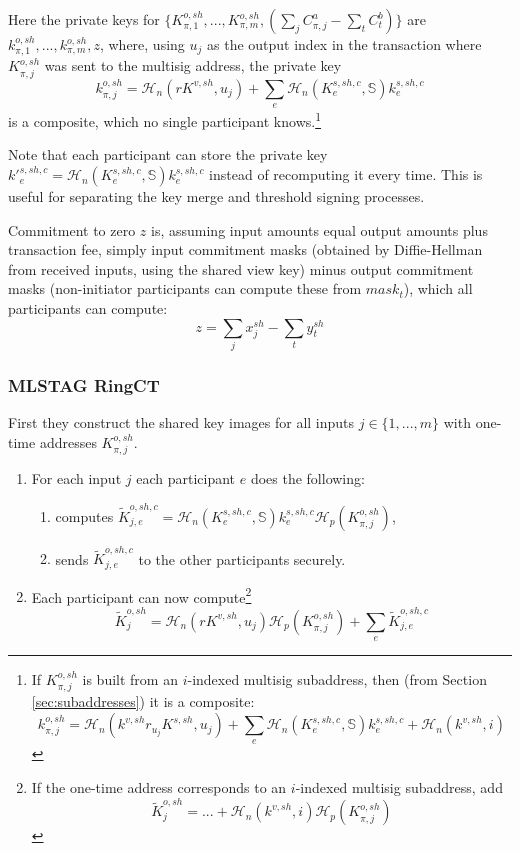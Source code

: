 Here the private keys for 
\(\{K^{o,sh}_{\pi,1},...,K^{o,sh}_{\pi,m}, (\sum\limits_j C_{\pi, j}^a - \sum\limits_t C^b_{t})\}\)
are \(k^{o,sh}_{\pi,1},...,k^{o,sh}_{\pi,m}, z\), where, using $u_j$ as the output index in the transaction where $K^{o,sh}_{\pi,j}$ was sent to the multisig address, the private key
\[k^{o,sh}_{\pi,j} = \mathcal{H}_n(r K^{v,sh}, u_j) + \sum_e \mathcal{H}_n(K^{s,sh,c}_e,\mathbb{S}) k^{s,sh,c}_e\] 
is a composite, which no single participant knows.\footnote{If $K^{o,sh}_{\pi,j}$ is built from an $i$-indexed multisig subaddress, then (from Section \ref{sec:subaddresses}) it is a composite:
\[ k^{o,sh}_{\pi,j} = \mathcal{H}_n(k^{v,sh} r_{u_j} K^{s,sh}, u_j) + \sum_e \mathcal{H}_n(K^{s,sh,c}_e,\mathbb{S}) k^{s,sh,c}_e + \mathcal{H}_n(k^{v,sh},i)\]}

Note that each participant can store the private key $k'^{s,sh,c}_e = \mathcal{H}_n(K^{s,sh,c}_e,\mathbb{S}) k^{s,sh,c}_e$ instead of recomputing it every time. This is useful for separating the key merge and threshold signing processes.

Commitment to zero $z$ is, assuming input amounts equal output amounts plus transaction fee, simply input commitment masks (obtained by Diffie-Hellman from received inputs, using the shared view key) minus output commitment masks (non-initiator participants can compute these from $\mathit{mask}_t$), which all participants can compute:
\[ z = \sum\limits_j x^{sh}_j - \sum\limits_t y^{sh}_t \]


\subsubsection*{MLSTAG RingCT}

First they construct the shared key images for all inputs $j \in \{1,...,m\}$ with one-time addresses $K^{o,sh}_{\pi,j}$.

\begin{enumerate}
    \item For each input $j$ each participant $e$ does the following:
    \begin{enumerate}
        \item computes $\tilde{K}^{o,sh,c}_{j,e} = \mathcal{H}_n(K^{s,sh,c}_e,\mathbb{S}) k^{s,sh,c}_e \mathcal{H}_p(K^{o,sh}_{\pi,j})$,
        \item sends $\tilde{K}^{o,sh,c}_{j,e}$ to the other participants securely.
    \end{enumerate}
    \item Each participant can now compute\footnote{If the one-time address corresponds to an $i$-indexed multisig subaddress, add
    \[ \tilde{K}^{o,sh}_j = ... + \mathcal{H}_n(k^{v,sh},i) \mathcal{H}_p(K^{o,sh}_{\pi,j})\]}
    \[ \tilde{K}^{o,sh}_j = \mathcal{H}_n(r K^{v,sh}, u_j) \mathcal{H}_p(K^{o,sh}_{\pi,j}) + \sum_e \tilde{K}^{o,sh,c}_{j,e} \]
\end{enumerate}

